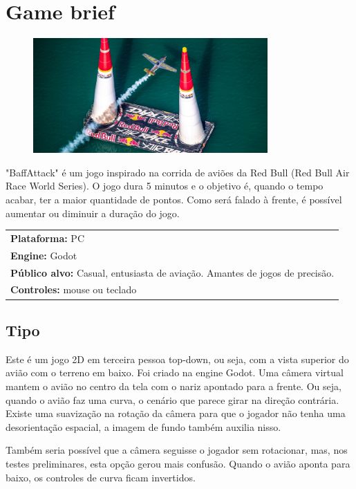 \chapter{Game brief}

\begin{figure}[h]
    \centering
    \includegraphics[width=0.8\textwidth]{red-bull-1.jpg}
\end{figure}
"BaffAttack" é um jogo inspirado na corrida de aviões da Red Bull (Red Bull Air Race World Series). O jogo dura 5 minutos e o objetivo é, 
quando o tempo acabar, ter a maior quantidade de pontos. Como será falado à frente, é possível aumentar ou diminuir a duração do jogo.

\begin{center}
\begin{tabular}{|l|}
\hline
\textbf{Plataforma:} PC \\ 
\textbf{Engine:} Godot \\ 
\textbf{Público alvo:} Casual, entusiasta de aviação. Amantes de jogos de precisão. \\ 
\textbf{Controles:} mouse ou teclado \\ 
\hline
\end{tabular}
\end{center}

\section*{Tipo}
Este é um jogo 2D em terceira pessoa top-down, ou seja, com a vista superior do avião com o terreno em baixo.
Foi criado na engine Godot. \cite{godot} \cite{godot-docs}
Uma câmera virtual mantem o avião no centro da tela com o nariz apontado para a frente. Ou seja, quando o avião faz uma curva, o cenário que parece girar na direção contrária. Existe uma suavização na rotação da câmera para que o jogador não tenha uma desorientação espacial, a imagem de fundo também auxilia nisso.

Também seria possível que a câmera seguisse o jogador sem rotacionar, mas, nos testes preliminares, esta opção gerou mais confusão. Quando o avião aponta para baixo, os controles de curva ficam invertidos.